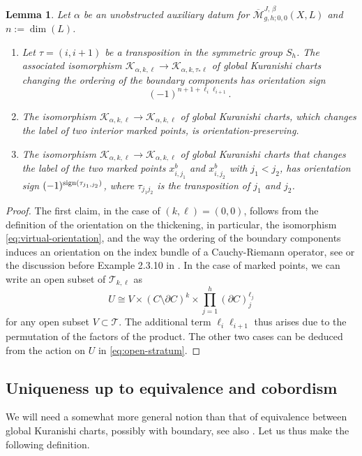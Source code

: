 \documentclass[11pt,psamsfonts, oneside, reqno]{amsart}
\newcommand{\sub}{\subset}%
\newcommand{\sm}{\ensuremath{\setminus}}%
\newcommand{\Mbar}{\overline{\mathcal M}}
\newcommand{\del}{\partial}
\newcommand{\cK}{\mathcal{K}}
\newcommand{\cT}{\mathcal{T}}
\newcommand{\fo}{\mathfrak{o}}
\newcommand{\fs}{\mathfrak{s}}
\newtheorem{lemma}[theorem]{Lemma}
\theoremstyle{definition}
\theoremstyle{remark}
\numberwithin{equation}{section}
\begin{document}
\begin{lemma}\label{lem:permutation-marked-points} Let $\alpha$ be an unobstructed auxiliary datum for $\Mbar_{g,h;0,0}^{J,\,\beta}(X,L)$ and $n := \dim(L)$.
	\begin{enumerate}[label=\arabic*),leftmargin=20pt,ref=\arabic*]
		\item\label{permute-circle} Let $\tau = (i,i+1)$ be a transposition in the symmetric group $S_h$. The associated isomorphism $\cK_{\alpha,k,\ell}\to \cK_{\alpha,k,\tau_*\ell}$ of global Kuranishi charts changing the ordering of the boundary components has orientation sign $$(-1)^{n+1+\ell_i\ell_{i+1}}.$$
		\item\label{permute-interior} The isomorphism $\cK_{\alpha,k,\ell}\to \cK_{\alpha,k,\ell}$ of global Kuranishi charts, which changes the label of two interior marked points, is orientation-preserving.
		\item\label{permute-boundary} The isomorphism $\cK_{\alpha,k,\ell}\to \cK_{\alpha,k,\ell}$ of global Kuranishi charts that changes the label of the two marked points $x^b_{i,j_1}$ and $x^b_{i,j_2}$ with $j_1 < j_2$, has orientation sign $(-1)^{\normalfont\text{sign}(\tau_{j_1,j_2})}$, where $\tau_{j_1j_2}$ is the transposition of $j_1$ and $j_2$.
	\end{enumerate}
\end{lemma}

\begin{proof} The first claim, in the case of $(k,\ell) = (0,0)$, follows from the definition of the orientation on the thickening, in particular, the isomorphism \eqref{eq:virtual-orientation}, and the way the ordering of the boundary components induces an orientation on the index bundle of a Cauchy-Riemann operator, see \cite[CROrient $1\fo\fs$(2)]{CZ24} or the discussion before Example 2.3.10 in \cite{WW17}. In the case of marked points, we can write an open subset of $\cT_{k,\ell}$ as 
	\begin{equation}\label{eq:open-stratum}U \cong V\times (C\sm \del C)^k \times \prod_{j = 1}^{h}(\del C)_j^{\ell_j} \end{equation}
		for any open subset $V\sub \cT$. The additional term $\ell_i\ell_{i+1}$ thus arises due to the permutation of the factors of the product.
		The other two cases can be deduced from the action on $U$ in \eqref{eq:open-stratum}.
\end{proof}
\subsection{Uniqueness up to equivalence and cobordism}\label{subsec:uniqueness} We will need a somewhat more general notion than that of equivalence between global Kuranishi charts, possibly with boundary, see also \cite[]{HS22}. Let us thus make the following definition.
\end{document}
